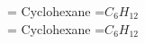 \documentclass[a4paper,14pt]{extarticle}
\begin{document}
 = Cyclohexane =$C_6H_{12}$ \\
 = Cyclohexane =$C_6H_{12}$
\end{document}
